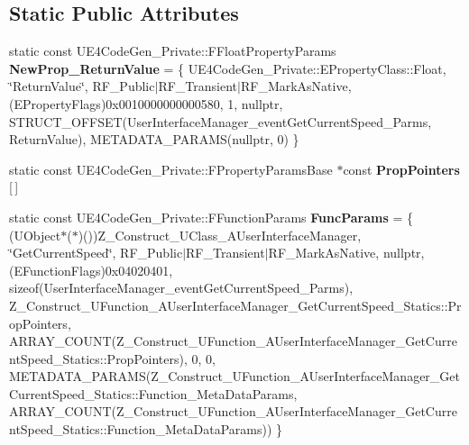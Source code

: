 \subsection*{Static Public Attributes}
\begin{DoxyCompactItemize}
\item 
\mbox{\label{struct_z___construct___u_function___a_user_interface_manager___get_current_speed___statics_afe7bafbebbbc701669b9cf8af1212761}} 
static const U\+E4\+Code\+Gen\+\_\+\+Private\+::\+F\+Float\+Property\+Params {\bfseries New\+Prop\+\_\+\+Return\+Value} = \{ U\+E4\+Code\+Gen\+\_\+\+Private\+::\+E\+Property\+Class\+::\+Float, \char`\"{}Return\+Value\char`\"{}, R\+F\+\_\+\+Public$\vert$R\+F\+\_\+\+Transient$\vert$R\+F\+\_\+\+Mark\+As\+Native, (E\+Property\+Flags)0x0010000000000580, 1, nullptr, S\+T\+R\+U\+C\+T\+\_\+\+O\+F\+F\+S\+E\+T(\+User\+Interface\+Manager\+\_\+event\+Get\+Current\+Speed\+\_\+\+Parms, Return\+Value), M\+E\+T\+A\+D\+A\+T\+A\+\_\+\+P\+A\+R\+A\+M\+S(nullptr, 0) \}
\item 
static const U\+E4\+Code\+Gen\+\_\+\+Private\+::\+F\+Property\+Params\+Base $\ast$const {\bfseries Prop\+Pointers} \mbox{[}$\,$\mbox{]}
\item 
\mbox{\label{struct_z___construct___u_function___a_user_interface_manager___get_current_speed___statics_a5ca3150f6ab9314e203e5f752420bbd9}} 
static const U\+E4\+Code\+Gen\+\_\+\+Private\+::\+F\+Function\+Params {\bfseries Func\+Params} = \{ (U\+Object$\ast$($\ast$)())Z\+\_\+\+Construct\+\_\+\+U\+Class\+\_\+\+A\+User\+Interface\+Manager, \char`\"{}Get\+Current\+Speed\char`\"{}, R\+F\+\_\+\+Public$\vert$R\+F\+\_\+\+Transient$\vert$R\+F\+\_\+\+Mark\+As\+Native, nullptr, (E\+Function\+Flags)0x04020401, sizeof(\+User\+Interface\+Manager\+\_\+event\+Get\+Current\+Speed\+\_\+\+Parms), Z\+\_\+\+Construct\+\_\+\+U\+Function\+\_\+\+A\+User\+Interface\+Manager\+\_\+\+Get\+Current\+Speed\+\_\+\+Statics\+::\+Prop\+Pointers, A\+R\+R\+A\+Y\+\_\+\+C\+O\+U\+N\+T(\+Z\+\_\+\+Construct\+\_\+\+U\+Function\+\_\+\+A\+User\+Interface\+Manager\+\_\+\+Get\+Current\+Speed\+\_\+\+Statics\+::\+Prop\+Pointers), 0, 0, M\+E\+T\+A\+D\+A\+T\+A\+\_\+\+P\+A\+R\+A\+M\+S(\+Z\+\_\+\+Construct\+\_\+\+U\+Function\+\_\+\+A\+User\+Interface\+Manager\+\_\+\+Get\+Current\+Speed\+\_\+\+Statics\+::\+Function\+\_\+\+Meta\+Data\+Params, A\+R\+R\+A\+Y\+\_\+\+C\+O\+U\+N\+T(\+Z\+\_\+\+Construct\+\_\+\+U\+Function\+\_\+\+A\+User\+Interface\+Manager\+\_\+\+Get\+Current\+Speed\+\_\+\+Statics\+::\+Function\+\_\+\+Meta\+Data\+Params)) \}
\end{DoxyCompactItemize}



